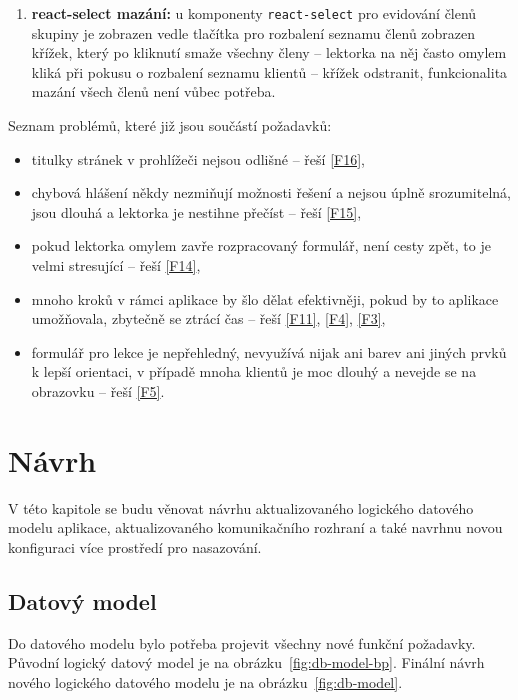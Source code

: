 \begin{enumerate}[label=\textbf{P\arabic*}]
    \item \label{P20} \textbf{react-select mazání:} u komponenty \verb|react-select| pro evidování členů skupiny je zobrazen vedle tlačítka pro rozbalení seznamu členů zobrazen křížek, který po kliknutí smaže všechny členy -- lektorka na něj často omylem kliká při pokusu o rozbalení seznamu klientů -- křížek odstranit, funkcionalita mazání všech členů není vůbec potřeba.
\end{enumerate}

Seznam problémů, které již jsou součástí požadavků:
\begin{itemize}
    \item titulky stránek v prohlížeči nejsou odlišné -- řeší \ref{F16},
    \item chybová hlášení někdy nezmiňují možnosti řešení a nejsou úplně srozumitelná, jsou dlouhá a lektorka je nestihne přečíst -- řeší \ref{F15},
    \item pokud lektorka omylem zavře rozpracovaný formulář, není cesty zpět, to je velmi stresující -- řeší \ref{F14},
    \item mnoho kroků v rámci aplikace by šlo dělat efektivněji, pokud by to aplikace umožňovala, zbytečně se ztrácí čas -- řeší \ref{F11}, \ref{F4}, \ref{F3},
    \item formulář pro lekce je nepřehledný, nevyužívá nijak ani barev ani jiných prvků k lepší orientaci, v případě mnoha klientů je moc dlouhý a nevejde se na obrazovku -- řeší \ref{F5}.
\end{itemize}

\chapter{Návrh}\label{chap:navrh}

V této kapitole se budu věnovat návrhu aktualizovaného logického datového modelu aplikace, aktualizovaného komunikačního rozhraní a také navrhnu novou konfiguraci více prostředí pro nasazování.

\section{Datový model}\label{sec:datovymodel}

Do datového modelu bylo potřeba projevit všechny nové funkční požadavky. Původní logický datový model je na obrázku~\ref{fig:db-model-bp}. Finální návrh nového logického datového modelu je na obrázku~\ref{fig:db-model}.

